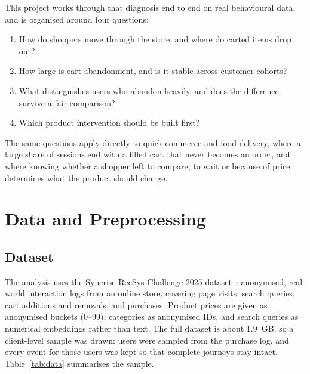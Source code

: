 \documentclass[11pt, a4paper]{article}
\begin{document}
This project works through that diagnosis end to end on real behavioural data, and is organised around four questions:
\begin{enumerate}[label=\textbf{Q\arabic*.}]
  \item How do shoppers move through the store, and where do carted items drop out?
  \item How large is cart abandonment, and is it stable across customer cohorts?
  \item What distinguishes users who abandon heavily, and does the difference survive a fair comparison?
  \item Which product intervention should be built first?
\end{enumerate}
The same questions apply directly to quick commerce and food delivery, where a large share of sessions end with a filled cart that never becomes an order, and where knowing whether a shopper left to compare, to wait or because of price determines what the product should change.

\section{Data and Preprocessing}
\subsection{Dataset}
The analysis uses the Synerise RecSys Challenge 2025 dataset~\cite{synerise}: anonymised, real-world interaction logs from an online store, covering page visits, search queries, cart additions and removals, and purchases. Product prices are given as anonymised buckets (0--99), categories as anonymised IDs, and search queries as numerical embeddings rather than text. The full dataset is about 1.9~GB, so a client-level sample was drawn: users were sampled from the purchase log, and every event for those users was kept so that complete journeys stay intact. Table~\ref{tab:data} summarises the sample.
\end{document}

